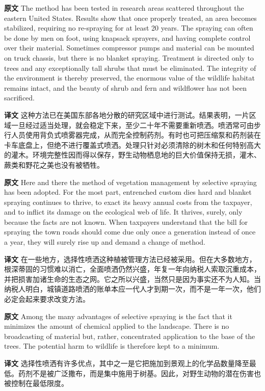 \documentclass[UTF8,zihao=-4]{ctexart}
\begin{document}
\noindent\textbf{原文} The method has been tested in research areas scattered throughout the eastern United States. Results show that once properly treated, an area becomes stabilized, requiring no re-spraying for at least 20 years. The spraying can often be done by men on foot, using knapsack sprayers, and having complete control over their material. Sometimes compressor pumps and material can be mounted on truck chassis, but there is no blanket spraying. Treatment is directed only to trees and any exceptionally tall shrubs that must be eliminated. The integrity of the environment is thereby preserved, the enormous value of the wildlife habitat remains intact, and the beauty of shrub and fern and wildflower has not been sacrificed.
\par
\noindent\textbf{译文} 这种方法已在美国东部各地分散的研究区域中进行测试。结果表明，一片区域一旦经过适当处理，就会稳定下来，至少二十年不需要重新喷洒。喷洒常可由步行人员使用背负式喷雾器完成，从而完全控制药剂。有时也可把压缩泵和药剂装在卡车底盘上，但绝不进行覆盖式喷洒。处理只针对必须清除的树木和任何特别高大的灌木。环境完整性因而得以保存，野生动物栖息地的巨大价值保持无损，灌木、蕨类和野花之美也没有被牺牲。
\par\medskip

\noindent\textbf{原文} Here and there the method of vegetation management by selective spraying has been adopted. For the most part, entrenched custom dies hard and blanket spraying continues to thrive, to exact its heavy annual costs from the taxpayer, and to inflict its damage on the ecological web of life. It thrives, surely, only because the facts are not known. When taxpayers understand that the bill for spraying the town roads should come due only once a generation instead of once a year, they will surely rise up and demand a change of method.
\par
\noindent\textbf{译文} 在一些地方，选择性喷洒这种植被管理方法已经被采用。但在大多数地方，根深蒂固的习惯难以消亡，全面喷洒仍然兴盛，年复一年向纳税人索取沉重成本，并把损害加诸生命的生态之网。它之所以兴盛，当然只是因为事实还不为人知。当纳税人明白，城镇道路喷洒的账单本应一代人才到期一次，而不是一年一次，他们必定会起来要求改变方法。
\par\medskip

\noindent\textbf{原文} Among the many advantages of selective spraying is the fact that it minimizes the amount of chemical applied to the landscape. There is no broadcasting of material but, rather, concentrated application to the base of the trees. The potential harm to wildlife is therefore kept to a minimum.
\par
\noindent\textbf{译文} 选择性喷洒有许多优点，其中之一是它把施加到景观上的化学品数量降至最低。药剂不是被广泛撒布，而是集中施用于树基。因此，对野生动物的潜在伤害也被控制在最低限度。
\par\medskip
\end{document}
